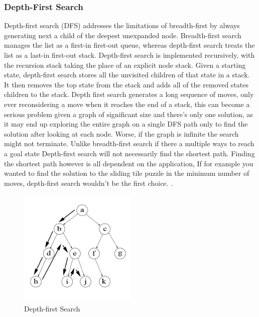 \documentclass[review]{cmpreport}
\begin{document}
\subsubsection{Depth-First Search}
Depth-first search (DFS) addresses the limitations of breadth-first by always generating next a child of the deepest unexpanded node. Breadth-first search manages the list as a first-in first-out queue, whereas depth-first search treats the list as a last-in first-out stack. Depth-first search is implemented recursively, with the recursion stack taking the place of an explicit node stack. Given a starting state, depth-first search stores all the unvisited children of that state in a stack. It then removes the top state from the stack and adds all of the removed states children to the stack. Depth first search generates a long sequence of moves, only ever reconsidering a move when it reaches the end of a stack, this can become a serious problem given a graph of significant size and there's only one solution, as it may end up exploring the entire graph on a single DFS path only to find the solution after looking at each node. Worse, if the graph is infinite the search might not terminate. Unlike breadth-first search if there a multiple ways to reach a goal state Depth-first search will not necessarily find the shortest path. Finding the shortest path however is all dependent on the application, If for example you wanted to find the solution to the sliding tile puzzle in the minimum number of moves, depth-first search wouldn't be the first choice. \citep{DBLP:journals/mima/Korf95}.
\begin{figure}[ht]
	\centering
	\includegraphics[width=0.5\textwidth]{depth_first}
	\captionsetup{justification=centering}
	\caption{Depth-first Search}
\end{figure}
\end{document}
